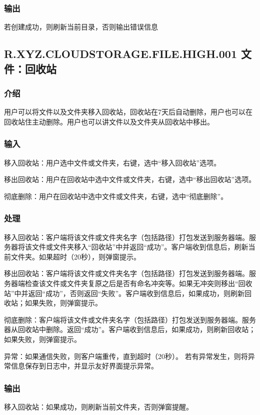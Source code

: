 \subsubsection{输出} 
若创建成功，则刷新当前目录，否则输出错误信息

\subsection{R.XYZ.CLOUDSTORAGE.FILE.HIGH.001 文件：回收站}

\subsubsection{介绍} 
用户可以将文件以及文件夹移入回收站，回收站在7天后自动删除，用户也可以在回收站住主动删除。用户也可以讲文件以及文件夹从回收站中移出。

\subsubsection{输入} 
移入回收站：用户选中文件或文件夹，右键，选中“移入回收站”选项。

移出回收站：用户在回收站中选中文件或文件夹，右键，选中“移出回收站”选项。

彻底删除：用户在回收站中选中文件或文件夹，右键，选中“彻底删除”。

\subsubsection{处理} 
移入回收站：客户端将该文件或文件夹名字（包括路径）打包发送到服务器端。服务器将该文件或文件夹移入“回收站”中并返回“成功”。客户端收到信息后，刷新当前文件夹。如果超时（20秒），则弹窗提示。

移出回收站：客户端将该文件或文件夹名字（包括路径）打包发送到服务器端。服务器端检查该文件或文件夹复原之后是否有命名冲突等。如果无冲突则移出“回收站”中并返回“成功”，否则返回“失败”。客户端收到信息后，如果成功，则刷新回收站；如果失败，则弹窗提示。

彻底删除：客户端将该文件或文件夹名字（包括路径）打包发送到服务器端。服务器从回收站中删除。返回“成功”。客户端收到信息后，如果成功，则刷新回收站；如果失败，则弹窗提示。

异常：如果通信失败，则客户端重传，直到超时（20秒）。
若有异常发生，则将异常信息保存到日志中，并显示友好界面提示异常。

\subsubsection{输出} 
移入回收站：如果成功，则刷新当前文件夹，否则弹窗提醒。

